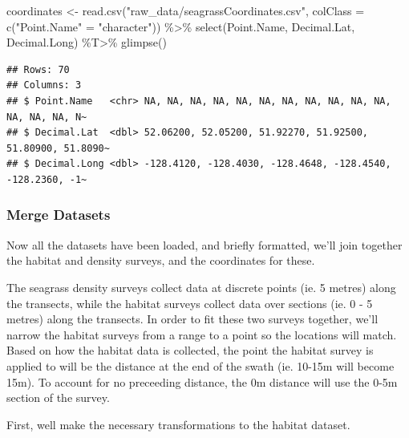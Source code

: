 \documentclass[
]{book}
\newenvironment{Shaded}{\begin{snugshade}}{\end{snugshade}}
\newcommand{\AttributeTok}[1]{\textcolor[rgb]{0.77,0.63,0.00}{#1}}
\newcommand{\FunctionTok}[1]{\textcolor[rgb]{0.00,0.00,0.00}{#1}}
\newcommand{\NormalTok}[1]{#1}
\newcommand{\OtherTok}[1]{\textcolor[rgb]{0.56,0.35,0.01}{#1}}
\newcommand{\SpecialCharTok}[1]{\textcolor[rgb]{0.00,0.00,0.00}{#1}}
\newcommand{\StringTok}[1]{\textcolor[rgb]{0.31,0.60,0.02}{#1}}
\begin{document}
\begin{Shaded}
\begin{Highlighting}[]
\NormalTok{coordinates }\OtherTok{\textless{}{-}} 
  \FunctionTok{read.csv}\NormalTok{(}\StringTok{"raw\_data/seagrassCoordinates.csv"}\NormalTok{,}
           \AttributeTok{colClass =} \FunctionTok{c}\NormalTok{(}\StringTok{"Point.Name"} \OtherTok{=} \StringTok{"character"}\NormalTok{)) }\SpecialCharTok{\%\textgreater{}\%}
  \FunctionTok{select}\NormalTok{(Point.Name, Decimal.Lat, Decimal.Long) }\SpecialCharTok{\%T\textgreater{}\%}
  \FunctionTok{glimpse}\NormalTok{()}
\end{Highlighting}
\end{Shaded}

\begin{verbatim}
## Rows: 70
## Columns: 3
## $ Point.Name   <chr> NA, NA, NA, NA, NA, NA, NA, NA, NA, NA, NA, NA, NA, NA, N~
## $ Decimal.Lat  <dbl> 52.06200, 52.05200, 51.92270, 51.92500, 51.80900, 51.8090~
## $ Decimal.Long <dbl> -128.4120, -128.4030, -128.4648, -128.4540, -128.2360, -1~
\end{verbatim}

\hypertarget{merge-datasets}{%
\subsubsection{Merge Datasets}\label{merge-datasets}}

Now all the datasets have been loaded, and briefly formatted, we'll join
together the habitat and density surveys, and the coordinates for these.

The seagrass density surveys collect data at discrete points (ie. 5 metres)
along the transects, while the habitat surveys collect data over sections
(ie. 0 - 5 metres) along the transects. In order to fit these two surveys
together, we'll narrow the habitat surveys from a range to a point so the
locations will match. Based on how the habitat data is collected, the point
the habitat survey is applied to will be the distance at the end of the
swath (ie. 10-15m will become 15m). To account for no preceeding distance,
the 0m distance will use the 0-5m section of the survey.

First, well make the necessary transformations to the habitat dataset.
\end{document}
